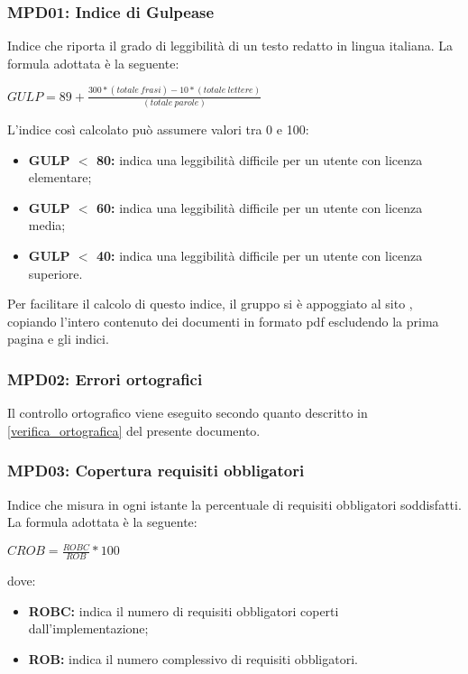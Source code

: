 \subsubsection{MPD01: Indice di Gulpease}
Indice che riporta il grado di leggibilità di un testo redatto in lingua italiana.
La formula adottata è la seguente:
\begin{center}
    $GULP = 89 + \displaystyle \frac{300*(totale\ frasi)-10*(totale\ lettere)}{(totale\ parole)}$
\end{center}
L'indice così calcolato può assumere valori tra 0 e 100:
\begin{itemize}
    \item \textbf{GULP $<$ 80:} indica una leggibilità difficile per un utente con licenza elementare;
    \item \textbf{GULP $<$ 60:} indica una leggibilità difficile per un utente con licenza media;
    \item \textbf{GULP $<$ 40:} indica una leggibilità difficile per un utente con licenza superiore.
\end{itemize}

Per facilitare il calcolo di questo indice, il gruppo si è appoggiato al sito \href{https://farfalla-project.org/readability_static/}, copiando
l'intero contenuto dei documenti in formato pdf escludendo la prima pagina e gli indici.

\subsubsection{MPD02: Errori ortografici}
Il controllo ortografico viene eseguito secondo quanto descritto in \ref{verifica_ortografica} del presente documento.

\subsubsection{MPD03: Copertura requisiti obbligatori}
Indice che misura in ogni istante la percentuale di requisiti obbligatori soddisfatti.
La formula adottata è la seguente:
\begin{center}
    $CROB = \displaystyle \frac{ROBC}{ROB}*100$
\end{center}
dove:
\begin{itemize}
    \item \textbf{ROBC:} indica il numero di requisiti obbligatori coperti dall'implementazione;
    \item \textbf{ROB:} indica il numero complessivo di requisiti obbligatori.
\end{itemize}

